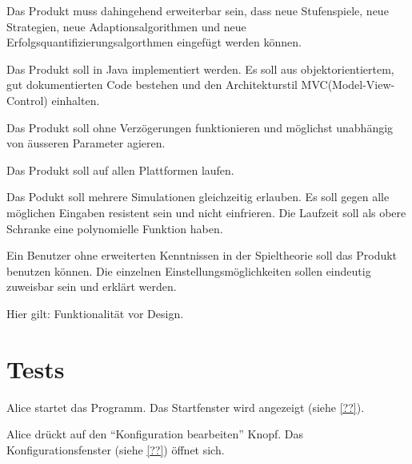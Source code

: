 \documentclass[parskip=full,11pt]{scrartcl}
\begin{document}

Das Produkt muss dahingehend erweiterbar sein,
dass neue Stufenspiele, neue Strategien, neue Adaptionsalgorithmen und neue Erfolgsquantifizierungsalgorthmen eingefügt werden können.


Das Produkt soll in Java implementiert werden. Es soll aus objektorientiertem, gut dokumentierten Code bestehen und den Architekturstil MVC(Model-View-Control) einhalten.


Das Produkt soll ohne Verzögerungen funktionieren und möglichst unabhängig von äusseren Parameter agieren.


Das Produkt soll auf allen Plattformen laufen.


Das Podukt soll mehrere Simulationen gleichzeitig erlauben. Es soll gegen alle möglichen Eingaben resistent sein und nicht einfrieren.
Die Laufzeit soll als obere Schranke eine polynomielle Funktion haben.


Ein Benutzer ohne erweiterten Kenntnissen in der Spieltheorie soll das Produkt benutzen können.
Die einzelnen Einstellungsmöglichkeiten sollen eindeutig zuweisbar sein und erklärt werden. 

Hier gilt: Funktionalität vor Design. 

\section{Tests}


{Alice startet das Programm.}
{Das Startfenster wird angezeigt (siehe \cref{??}).}

{Alice drückt auf den \enquote{Konfiguration bearbeiten} Knopf.}%
{Das Konfigurationsfenster (siehe \cref{??}) öffnet sich.}
\end{document}
